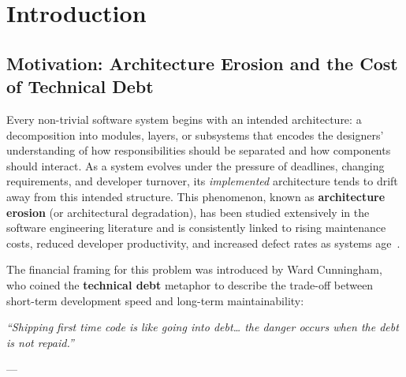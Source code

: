 \chapter{Introduction}
\label{ch:introduction}

\section{Motivation: Architecture Erosion and the Cost of Technical Debt}
\label{sec:motivation}

Every non-trivial software system begins with an intended architecture: a decomposition into modules, layers, or subsystems that encodes the designers' understanding of how responsibilities should be separated and how components should interact. As a system evolves under the pressure of deadlines, changing requirements, and developer turnover, its \emph{implemented} architecture tends to drift away from this intended structure. This phenomenon, known as \textbf{architecture erosion} (or architectural degradation), has been studied extensively in the software engineering literature and is consistently linked to rising maintenance costs, reduced developer productivity, and increased defect rates as systems age~\citep{li2022erosion}.

The financial framing for this problem was introduced by Ward Cunningham, who coined the \textbf{technical debt} metaphor to describe the trade-off between short-term development speed and long-term maintainability:

\textit{``Shipping first time code is like going into debt\ldots{} the danger occurs when the debt is not repaid.''}

\hfill --- \citet{cunningham1992wycash}

